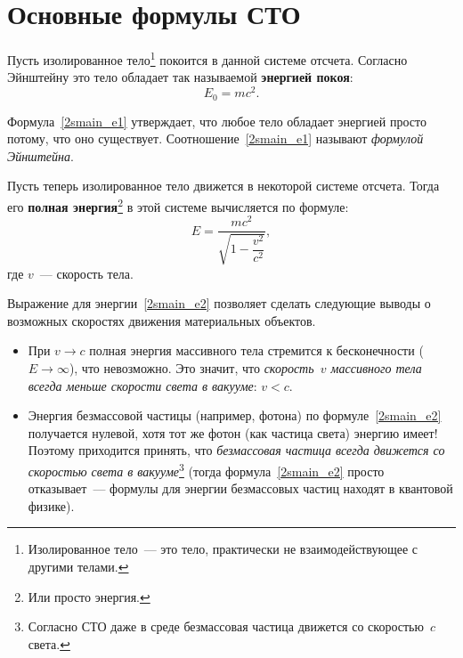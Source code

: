 \documentclass[main.tex]{subfiles}
\begin{document}

 


\setcounter{section}{14
}
\addtocounter{section}{-1} 

\section{Основные формулы СТО}


Пусть изолированное тело\footnote{Изолированное тело~--- это тело, практически не взаимодействующее с другими телами.} покоится в данной системе отсчета. Согласно Эйнштейну это тело обладает так называемой \textbf{энергией покоя}:
\begin{equation}
    \label{2smain_e1}
    E_0=mc^2.
\end{equation}

Формула~\eqref{2smain_e1} утверждает, что любое тело обладает энергией просто потому, что оно существует. Соотношение~\eqref{2smain_e1} называют \emph{формулой Эйнштейна}.

Пусть теперь изолированное тело движется в некоторой системе отсчета. Тогда его \textbf{полная энергия}\footnote{Или просто энергия.} в этой системе вычисляется по формуле:
\begin{equation}
    \label{2smain_e2}
    E=\frac{mc^2}{\sqrt{1-\dfrac{v^2}{c^2}}},
\end{equation}
где $v$~--- скорость тела.

Выражение для энергии~\eqref{2smain_e2} позволяет сделать следующие выводы о возможных скоростях движения материальных объектов.
\begin{itemize}
    \item При $v\to c$ полная энергия массивного тела стремится к бесконечности ($E\to\infty$), что невозможно. Это значит, что \emph{скорость~$v$ массивного тела всегда меньше скорости света в вакууме}: $v<c$.
    \item Энергия безмассовой частицы (например, фотона) по формуле~\eqref{2smain_e2} получается нулевой, хотя тот же фотон (как частица света) энергию имеет! Поэтому приходится принять, что \emph{безмассовая частица всегда движется со скоростью света в вакууме}\footnote{Согласно СТО даже в среде безмассовая частица движется со скоростью~$c$ света.} (тогда формула~\eqref{2smain_e2} просто отказывает~--- формулы для энергии безмассовых частиц находят в квантовой физике).   
\end{itemize}
\end{document}
